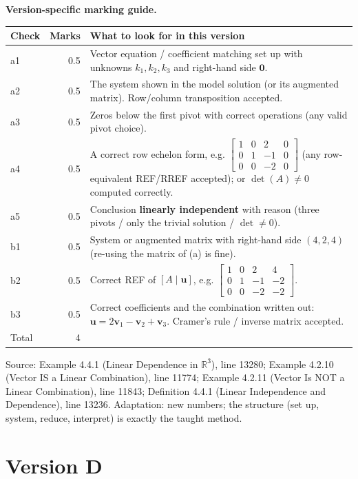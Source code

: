 \documentclass[11pt,a4paper]{article}
\newcommand{\Src}[1]{{\footnotesize\color{black!65}Source: #1}}
\begin{document}
\textbf{Version-specific marking guide.}\par
\begin{tabularx}{\linewidth}{@{}l r >{\raggedright\arraybackslash}X@{}}\toprule Check & Marks & What to look for in this version\\\midrule
a1 & 0.5 & Vector equation / coefficient matching set up with unknowns $k_1,k_2,k_3$ and right-hand side $\mathbf{0}$.\\
a2 & 0.5 & The system shown in the model solution (or its augmented matrix). Row/column transposition accepted.\\
a3 & 0.5 & Zeros below the first pivot with correct operations (any valid pivot choice).\\
a4 & 0.5 & A correct row echelon form, e.g. $\left[\begin{array}{ccc|c} 1 & 0 & 2 & 0 \\ 0 & 1 & -1 & 0 \\ 0 & 0 & -2 & 0 \end{array}\right]$ (any row-equivalent REF/RREF accepted); or $\det(A)\neq0$ computed correctly.\\
a5 & 0.5 & Conclusion \textbf{linearly independent} with reason (three pivots / only the trivial solution / $\det\neq0$).\\
b1 & 0.5 & System or augmented matrix with right-hand side $(4,2,4)$ (re-using the matrix of (a) is fine).\\
b2 & 0.5 & Correct REF of $[A\mid\mathbf{u}]$, e.g. $\left[\begin{array}{ccc|c} 1 & 0 & 2 & 4 \\ 0 & 1 & -1 & -2 \\ 0 & 0 & -2 & -2 \end{array}\right]$.\\
b3 & 0.5 & Correct coefficients and the combination written out: $\mathbf{u}=2\mathbf{v}_1-\mathbf{v}_2+\mathbf{v}_3$. Cramer's rule / inverse matrix accepted.\\
\midrule Total & 4 & \\\bottomrule\end{tabularx}
\Src{Example 4.4.1 (Linear Dependence in $\mathbb{R}^3$), line 13280; Example 4.2.10 (Vector IS a Linear Combination), line 11774; Example 4.2.11 (Vector Is NOT a Linear Combination), line 11843; Definition 4.4.1 (Linear Independence and Dependence), line 13236. Adaptation: new numbers; the structure (set up, system, reduce, interpret) is exactly the taught method.}\par
\clearpage\section*{Version D}
\end{document}
